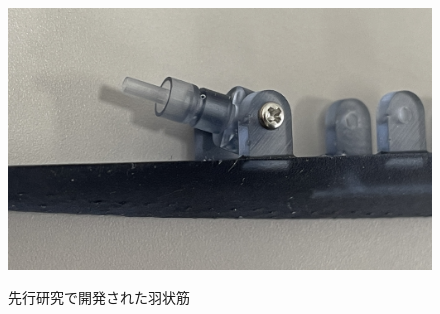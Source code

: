 \begin{figure}[htbp]
\begin{minipage}{0.49\hsize}
    \label{fig:MPA_tanbu_3_1}
  \end{minipage}
  \begin{minipage}{0.49\hsize}
    \centering  
    \includegraphics[scale=0.2]{image/real_tanbu.jpg}
    \label{fig:MPA_tanbu_3_2}
  \end{minipage}
  \caption{先行研究で開発された羽状筋}
  \label{fig:tanbu_parts_new}
\end{figure}
